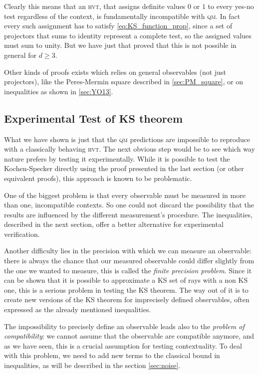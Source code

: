 \documentclass[a4paper]{article}
\newcommand{\acron}[1]{\textsc{#1}}
\newcommand{\HVT}{\acron{hvt}}
\newcommand{\QM}{\acron{qm}}
\theoremstyle{definition}
\begin{document}
Clearly this means that an \HVT{}, that assigns definite values $0$ or $1$ to every
yes-no test regardless of the context, is fundamentally incompatible with \QM{}.
In fact every such assignment has to satisfy \eqref{eq:KS_function_prop}, since a
set of projectors that sums to identity represent a complete test, so the
assigned values must sum to unity.
But we have just that proved that this is not possible in general for $d \ge 3$.

Other kinds of proofs exists which relies on general observables (not just
projectors), like the Peres-Mermin square described in \ref{sec:PM_square}, or
on inequalities as shown in \ref{sec:YO13}.

\subsection{Experimental Test of KS theorem}
\label{sec:exp_KS}
What we have shown is just that the \QM{} predictions are impossible to reproduce
with a classically behaving \HVT{}.
The next obvious step would be to see which way nature prefers by testing it
experimentally.
While it is possible to test the Kochen-Specker directly using the proof presented
in the last section (or other equivalent proofs), this approach is known to be
problematic.

One of the biggest problem is that every observable must be measured in more
than one, incompatible contexts. So one could not discard the possibility that
the results are influenced by the different measurement's procedure.
The inequalities, described in the next section, offer a better alternative for
experimental verification.

Another difficulty lies in the precision with which we can measure an
observable: there is always the chance that our measured observable could
differ slightly from the one we wanted to measure, this is called the \emph{finite
precision problem}.
Since it can be shown that it is possible to approximate a \acron{KS} set of rays with a
non \acron{KS} one, this is a serious problem in testing the \acron{KS}
theorem.
The way out of it is to create new versions of the \acron{KS} theorem
for imprecisely defined observables, often expressed as the already mentioned
inequalities.

The impossibility to precisely define an observable leads also to the
\emph{problem of compatibility}: we cannot assume that the observable are
compatible anymore, and as we have seen, this is a crucial assumption for
testing contextuality.
To deal with this problem, we need to add new terms to the classical bound in
inequalities, as will be described in the section \ref{sec:noise}.
\end{document}
